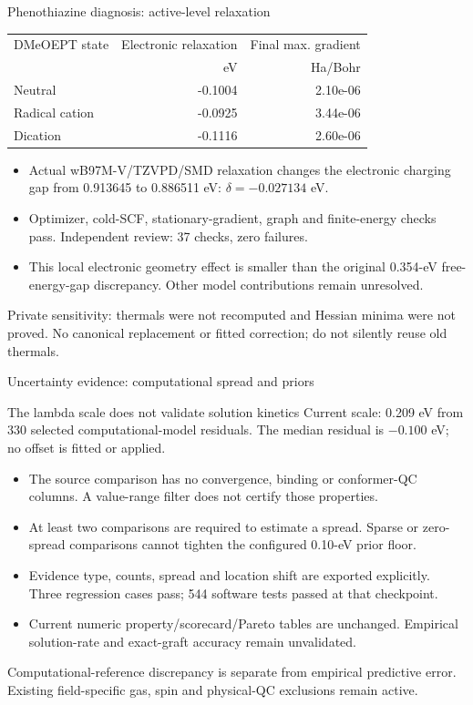\begin{frame}{Phenothiazine diagnosis: active-level relaxation}
  \small
  \begin{center}
  \begin{tabular}{lrr}
    \toprule
    DMeOEPT state & Electronic relaxation & Final max. gradient \\
    & eV & Ha/Bohr \\
    \midrule
Neutral & -0.1004 & 2.10e-06 \\
Radical cation & -0.0925 & 3.44e-06 \\
Dication & -0.1116 & 2.60e-06 \\
    \bottomrule
  \end{tabular}
  \end{center}
  \begin{itemize}
    \item Actual wB97M-V/TZVPD/SMD relaxation changes the electronic charging gap
      from 0.913645 to 0.886511 eV: $\delta=-0.027134$ eV.
    \item Optimizer, cold-SCF, stationary-gradient, graph and finite-energy checks
      pass. Independent review: 37 checks, zero failures.
    \item This local electronic geometry effect is smaller than the original
      0.354-eV free-energy-gap discrepancy. Other model contributions remain unresolved.
  \end{itemize}
  \vfill\scriptsize Private sensitivity: thermals were not recomputed and Hessian minima
  were not proved. No canonical replacement or fitted correction; do not silently reuse old thermals.
\end{frame}

\begin{frame}{Uncertainty evidence: computational spread and priors}
  \begin{block}{The lambda scale does not validate solution kinetics}
    Current scale: 0.209 eV from 330 selected computational-model residuals.
    The median residual is $-0.100$ eV; no offset is fitted or applied.
  \end{block}
  \begin{itemize}
    \item The source comparison has no convergence, binding or conformer-QC columns.
      A value-range filter does not certify those properties.
    \item At least two comparisons are required to estimate a spread. Sparse or
      zero-spread comparisons cannot tighten the configured 0.10-eV prior floor.
    \item Evidence type, counts, spread and location shift are exported explicitly.
      Three regression cases pass; 544 software tests passed at that checkpoint.
    \item Current numeric property/scorecard/Pareto tables are unchanged.
      Empirical solution-rate and exact-graft accuracy remain unvalidated.
  \end{itemize}
  \vfill\scriptsize Computational-reference discrepancy is separate from empirical
  predictive error. Existing field-specific gas, spin and physical-QC exclusions remain active.
\end{frame}
